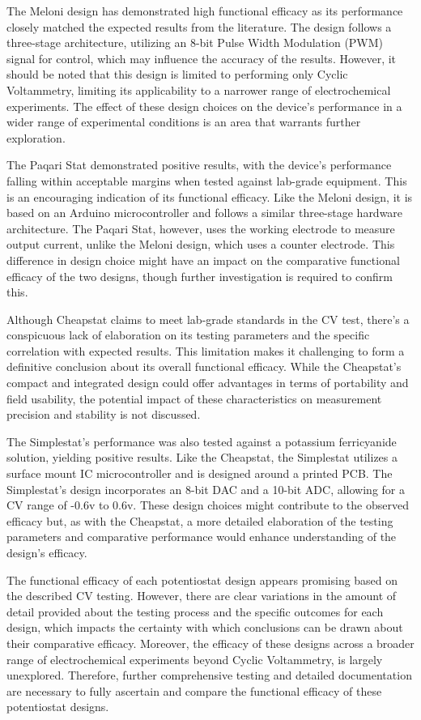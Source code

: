 \documentclass{article}
\begin{document}
The Meloni design has demonstrated high functional efficacy as its performance closely matched the expected results from the literature. The design follows a three-stage architecture, utilizing an 8-bit Pulse Width Modulation (PWM) signal for control, which may influence the accuracy of the results. However, it should be noted that this design is limited to performing only Cyclic Voltammetry, limiting its applicability to a narrower range of electrochemical experiments. The effect of these design choices on the device's performance in a wider range of experimental conditions is an area that warrants further exploration.

The Paqari Stat demonstrated positive results, with the device's performance falling within acceptable margins when tested against lab-grade equipment. This is an encouraging indication of its functional efficacy. Like the Meloni design, it is based on an Arduino microcontroller and follows a similar three-stage hardware architecture. The Paqari Stat, however, uses the working electrode to measure output current, unlike the Meloni design, which uses a counter electrode. This difference in design choice might have an impact on the comparative functional efficacy of the two designs, though further investigation is required to confirm this.

Although Cheapstat claims to meet lab-grade standards in the CV test, there's a conspicuous lack of elaboration on its testing parameters and the specific correlation with expected results. This limitation makes it challenging to form a definitive conclusion about its overall functional efficacy. While the Cheapstat's compact and integrated design could offer advantages in terms of portability and field usability, the potential impact of these characteristics on measurement precision and stability is not discussed.

The Simplestat's performance was also tested against a potassium ferricyanide solution, yielding positive results. Like the Cheapstat, the Simplestat utilizes a surface mount IC microcontroller and is designed around a printed PCB. The Simplestat's design incorporates an 8-bit DAC and a 10-bit ADC, allowing for a CV range of -0.6v to 0.6v. These design choices might contribute to the observed efficacy but, as with the Cheapstat, a more detailed elaboration of the testing parameters and comparative performance would enhance understanding of the design's efficacy.

The functional efficacy of each potentiostat design appears promising based on the described CV testing. However, there are clear variations in the amount of detail provided about the testing process and the specific outcomes for each design, which impacts the certainty with which conclusions can be drawn about their comparative efficacy. Moreover, the efficacy of these designs across a broader range of electrochemical experiments beyond Cyclic Voltammetry, is largely unexplored. Therefore, further comprehensive testing and detailed documentation are necessary to fully ascertain and compare the functional efficacy of these potentiostat designs.
\end{document}
